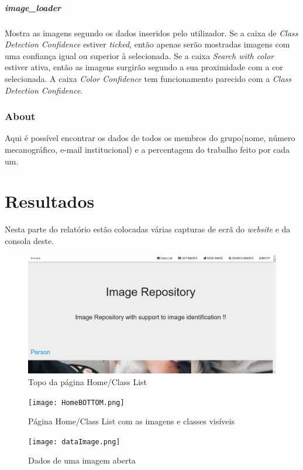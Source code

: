 \documentclass{report}
\begin{document}
\paragraph{image\_loader}
Mostra as imagens segundo os dados inseridos pelo utilizador. Se a caixa de \textit{Class Detection Confidence} 
estiver \textit{ticked}, 
então apenas serão mostradas imagens com uma confiança igual ou superior à selecionada. Se a caixa 
\textit{Search with color} estiver ativa, então as imagens surgirão segundo a sua proximidade com a cor selecionada. 
A caixa \textit{Color Confidence} tem funcionamento parecido com a \textit{Class Detection Confidence}.

\subsection{About}
Aqui é possível encontrar os dados de todos os membros do grupo(nome, número mecanográfico, e-mail institucional) e a percentagem do trabalho feito por cada um.


\chapter{Resultados}
\label{chap.resultados}
Nesta parte do relatório estão colocadas várias capturas de ecrã do \textit{website} e da consola deste.
\begin{figure}[h]
\includegraphics[width=\textwidth]{HomeTOP.png}
\caption{Topo da página Home/Class List}
\label{Fig1}
\end{figure}

\begin{figure}[h]
\texttt{[image: HomeBOTTOM.png]}
\caption{Página Home/Class List com as imagens e classes visíveis}
\label{Fig2}
\end{figure}

\begin{figure}[h]
\texttt{[image: dataImage.png]}
\caption{Dados de uma imagem aberta}
\label{Fig3}
\end{figure}
\end{document}
